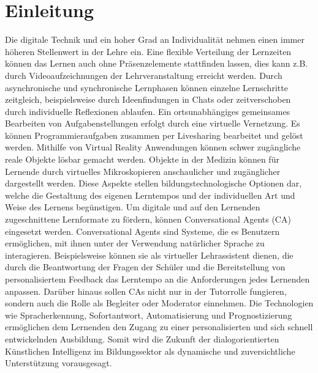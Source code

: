 \chapter{Einleitung}
Die digitale Technik und ein hoher Grad an Individualität nehmen einen immer höheren Stellenwert in der Lehre ein. 
Eine flexible Verteilung der Lernzeiten können das Lernen auch ohne Präsenzelemente stattfinden lassen, dies kann z.B. durch Videoaufzeichnungen der Lehrveranstaltung  erreicht werden.
Durch asynchronische und synchronische Lernphasen können einzelne Lernschritte zeitgleich, beispielsweise durch Ideenfindungen in Chats oder zeitverschoben durch individuelle Reflexionen ablaufen.
Ein ortsunabhängiges gemeinsames Bearbeiten von Aufgabenstellungen erfolgt durch eine virtuelle Vernetzung. Es können Programmieraufgaben zusammen per Livesharing bearbeitet und gelöst werden. Mithilfe von Virtual Reality Anwendungen können schwer zugängliche reale Objekte lösbar gemacht werden. Objekte in der Medizin können für Lernende durch virtuelles Mikroskopieren anschaulicher und zugänglicher dargestellt werden.
Diese Aspekte stellen bildungstechnologische Optionen dar, welche die Gestaltung des eigenen Lerntempos und 
der individuellen Art und Weise des Lernens
begünstigen. \parencite[170]{Lehner.2018} 
Um digitale und auf den Lernenden zugeschnittene Lernformate zu fördern, können Conversational Agents (CA) eingesetzt werden. 
Conversational Agents sind Systeme, die es Benutzern ermöglichen, mit ihnen unter der Verwendung natürlicher Sprache zu interagieren. \parencite[2 ff.]{Gnewuch.2017}
Beispielsweise können sie als virtueller Lehrassistent dienen, die durch die Beantwortung der Fragen der Schüler und die Bereitstellung 
von personalisiertem Feedback das Lerntempo an die Anforderungen jedes Lernenden anpassen.
Darüber hinaus sollen CAs nicht nur in der Tutorrolle fungieren, sondern auch die Rolle als Begleiter oder Moderator einnehmen. \parencite[46 ff.]{strohmann.2021} \parencite[10 ff.]{Strohmann.2018} 
Die Technologien wie Spracherkennung, Sofortantwort, Automatisierung und Prognostizierung ermöglichen dem Lernenden den Zugang zu einer personalisierten und sich schnell entwickelnden Ausbildung.
Somit wird die Zukunft der dialogorientierten Künstlichen Intelligenz im Bildungssektor als dynamische und zuversichtliche Unterstützung vorausgesagt. \parencite[1]{kumar.2021} \parencite[1]{pinker.2019}  

